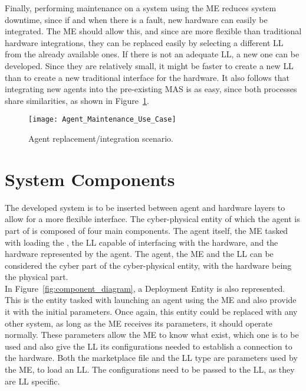 Finally, performing maintenance on a system using the \acrshort{ME} reduces system downtime, since if and when there is a fault, new hardware can easily be integrated. The \acrlong{ME} should allow this, and since  are more flexible than traditional hardware integrations, they can be replaced easily by selecting a different \acrshort{LL} from the already available ones. If there is not an adequate \acrshort{LL}, a new one can be developed. Since they are relatively small, it might be faster to create a new \acrshort{LL} than to create a new traditional interface for the hardware. It also follows that integrating new agents into the pre-existing \acrshort{MAS} is as easy, since both processes share similarities, as shown in Figure~\ref{fig:agent_maintenance_use_case}.\\

\begin{figure}[h!]
	\centering
		\texttt{[image: Agent\_Maintenance\_Use\_Case]}
	\caption{Agent replacement/integration scenario.}
	\label{fig:agent_maintenance_use_case}
\end{figure}

\section{System Components}
\label{sec:system_components}

The developed system is to be inserted between agent and hardware layers to allow for a more flexible interface. The cyber-physical entity of which the agent is part of is composed of four main components. The agent itself, the \acrlong{ME} tasked with loading the , the \acrshort{LL} capable of interfacing with the hardware, and the hardware represented by the agent. The agent, the \acrshort{ME} and the \acrshort{LL} can be considered the cyber part of the cyber-physical entity, with the hardware being the physical part.\\

In Figure~\ref{fig:component_diagram}, a Deployment Entity is also represented. This is the entity tasked with launching an agent using the \acrshort{ME} and also provide it with the initial parameters. Once again, this entity could be replaced with any other system, as long as the \acrshort{ME} receives its parameters, it should operate normally. These parameters allow the \acrshort{ME} to know what  exist, which one is to be used and also give the \acrshort{LL} its configurations needed to establish a connection to the hardware. Both the marketplace file and the \acrshort{LL} type are parameters used by the \acrshort{ME}, to load an \acrshort{LL}. The configurations need to be passed to the \acrlong{LL}, as they are \acrshort{LL} specific.\\

